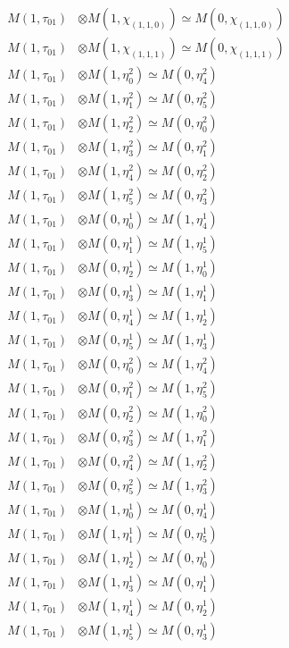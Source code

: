 \begin{align*}
M(1,\tau_{01}) &\otimes M(1,\chi_{(1,1,0)}) \simeq M(0,\chi_{(1,1,0)}) \\
M(1,\tau_{01}) &\otimes M(1,\chi_{(1,1,1)}) \simeq M(0,\chi_{(1,1,1)}) \\
M(1,\tau_{01}) &\otimes M(1,\eta^{2}_{0}) \simeq M(0,\eta^{2}_{4}) \\
M(1,\tau_{01}) &\otimes M(1,\eta^{2}_{1}) \simeq M(0,\eta^{2}_{5}) \\
M(1,\tau_{01}) &\otimes M(1,\eta^{2}_{2}) \simeq M(0,\eta^{2}_{0}) \\
M(1,\tau_{01}) &\otimes M(1,\eta^{2}_{3}) \simeq M(0,\eta^{2}_{1}) \\
M(1,\tau_{01}) &\otimes M(1,\eta^{2}_{4}) \simeq M(0,\eta^{2}_{2}) \\
M(1,\tau_{01}) &\otimes M(1,\eta^{2}_{5}) \simeq M(0,\eta^{2}_{3}) \\
M(1,\tau_{01}) &\otimes M(0,\eta^{1}_{0}) \simeq M(1,\eta^{1}_{4}) \\
M(1,\tau_{01}) &\otimes M(0,\eta^{1}_{1}) \simeq M(1,\eta^{1}_{5}) \\
M(1,\tau_{01}) &\otimes M(0,\eta^{1}_{2}) \simeq M(1,\eta^{1}_{0}) \\
M(1,\tau_{01}) &\otimes M(0,\eta^{1}_{3}) \simeq M(1,\eta^{1}_{1}) \\
M(1,\tau_{01}) &\otimes M(0,\eta^{1}_{4}) \simeq M(1,\eta^{1}_{2}) \\
M(1,\tau_{01}) &\otimes M(0,\eta^{1}_{5}) \simeq M(1,\eta^{1}_{3}) \\
M(1,\tau_{01}) &\otimes M(0,\eta^{2}_{0}) \simeq M(1,\eta^{2}_{4}) \\
M(1,\tau_{01}) &\otimes M(0,\eta^{2}_{1}) \simeq M(1,\eta^{2}_{5}) \\
M(1,\tau_{01}) &\otimes M(0,\eta^{2}_{2}) \simeq M(1,\eta^{2}_{0}) \\
M(1,\tau_{01}) &\otimes M(0,\eta^{2}_{3}) \simeq M(1,\eta^{2}_{1}) \\
M(1,\tau_{01}) &\otimes M(0,\eta^{2}_{4}) \simeq M(1,\eta^{2}_{2}) \\
M(1,\tau_{01}) &\otimes M(0,\eta^{2}_{5}) \simeq M(1,\eta^{2}_{3}) \\
M(1,\tau_{01}) &\otimes M(1,\eta^{1}_{0}) \simeq M(0,\eta^{1}_{4}) \\
M(1,\tau_{01}) &\otimes M(1,\eta^{1}_{1}) \simeq M(0,\eta^{1}_{5}) \\
M(1,\tau_{01}) &\otimes M(1,\eta^{1}_{2}) \simeq M(0,\eta^{1}_{0}) \\
M(1,\tau_{01}) &\otimes M(1,\eta^{1}_{3}) \simeq M(0,\eta^{1}_{1}) \\
M(1,\tau_{01}) &\otimes M(1,\eta^{1}_{4}) \simeq M(0,\eta^{1}_{2}) \\
M(1,\tau_{01}) &\otimes M(1,\eta^{1}_{5}) \simeq M(0,\eta^{1}_{3}) \\
\end{align*}


